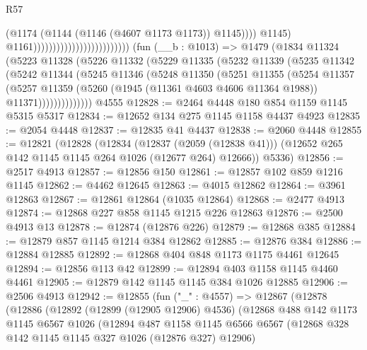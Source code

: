 \begin{lexlean}{R57}
\begin{coremodule}
                                                            (@1174
                                                              (@1144
                                                                (@1146 (@4607 @1173 @1173))
                                                                @1145))))
                                                        @1145)
                                                      @1161)))))))))))))))))))))))))
    (fun (__b : @1013) =>
    @1479
      (@1834
        @11324
        (@5223
          @11328
          (@5226
            @11332
            (@5229
              @11335
              (@5232
                @11339
                (@5235
                  @11342
                  (@5242
                    @11344
                    (@5245
                      @11346
                      (@5248
                        @11350
                        (@5251
                          @11355
                          (@5254
                            @11357
                            (@5257
                              @11359
                              (@5260 (@1945 (@11361 @4603 @4606 @11364 @1988)) @11371))))))))))))))
    @4555
@12828 := @2464 @4448 @180 @854 @1159 @1145 @5315 @5317
@12834 := @12652 @134 @275 @1145 @1158 @4437 @4923
@12835 := @2054 @4448
@12837 := @12835 @41 @4437
@12838 := @2060 @4448
@12855 := @12821
    (@12828
      (@12834
        (@12837 (@2059 (@12838 @41)))
        (@12652 @265 @142 @1145 @1145 @264 @1026 (@12677 @264) @12666))
      @5336)
@12856 := @2517 @4913
@12857 := @12856 @150
@12861 := @12857 @102 @859 @1216 @1145
@12862 := @4462 @12645
@12863 := @4015 @12862
@12864 := @3961 @12863
@12867 := @12861 @12864 (@1035 @12864)
@12868 := @2477 @4913
@12874 := @12868 @227 @858 @1145 @1215 @226 @12863
@12876 := @2500 @4913 @13
@12878 := @12874 (@12876 @226)
@12879 := @12868 @385
@12884 := @12879 @857 @1145 @1214 @384 @12862
@12885 := @12876 @384
@12886 := @12884 @12885
@12892 := @12868 @404 @848 @1173 @1175 @4461 @12645
@12894 := @12856 @113 @42
@12899 := @12894 @403 @1158 @1145 @4460 @4461
@12905 := @12879 @142 @1145 @1145 @384 @1026 @12885
@12906 := @2506 @4913
@12942 := @12855
    (fun ("_" : @4557) =>
    @12867
      (@12878
        (@12886
          (@12892
            (@12899 (@12905 @12906) @4536)
            (@12868
              @488
              @142
              @1173
              @1145
              @6567
              @1026
              (@12894
                @487
                @1158
                @1145
                @6566
                @6567
                (@12868 @328 @142 @1145 @1145 @327 @1026 (@12876 @327) @12906)

\end{coremodule}
\end{lexlean}
